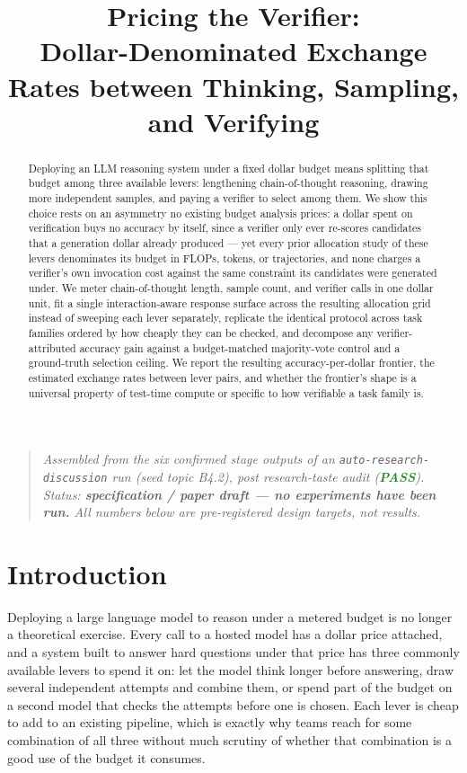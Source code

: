 \documentclass[11pt]{article}
\title{\textbf{Pricing the Verifier:\\ Dollar-Denominated Exchange Rates between Thinking, Sampling, and Verifying}}
\author{}
\date{}
\begin{document}
\maketitle
\vspace{-2em}

\begin{quote}
\small\textit{Assembled from the six confirmed stage outputs of an \texttt{auto-research-discussion} run (seed topic B4.2), post research-taste audit (\textcolor{ForestGreen}{\textbf{PASS}}). Status: \textbf{specification / paper draft --- no experiments have been run.} All numbers below are pre-registered design targets, not results.}
\end{quote}

\begin{abstract}
Deploying an LLM reasoning system under a fixed dollar budget means splitting that budget among three available levers: lengthening chain-of-thought reasoning, drawing more independent samples, and paying a verifier to select among them. We show this choice rests on an asymmetry no existing budget analysis prices: a dollar spent on verification buys no accuracy by itself, since a verifier only ever re-scores candidates that a generation dollar already produced --- yet every prior allocation study of these levers denominates its budget in FLOPs, tokens, or trajectories, and none charges a verifier's own invocation cost against the same constraint its candidates were generated under. We meter chain-of-thought length, sample count, and verifier calls in one dollar unit, fit a single interaction-aware response surface across the resulting allocation grid instead of sweeping each lever separately, replicate the identical protocol across task families ordered by how cheaply they can be checked, and decompose any verifier-attributed accuracy gain against a budget-matched majority-vote control and a ground-truth selection ceiling. We report the resulting accuracy-per-dollar frontier, the estimated exchange rates between lever pairs, and whether the frontier's shape is a universal property of test-time compute or specific to how verifiable a task family is.
\end{abstract}

\section{Introduction}

Deploying a large language model to reason under a metered budget is no longer a theoretical exercise. Every call to a hosted model has a dollar price attached, and a system built to answer hard questions under that price has three commonly available levers to spend it on: let the model think longer before answering, draw several independent attempts and combine them, or spend part of the budget on a second model that checks the attempts before one is chosen. Each lever is cheap to add to an existing pipeline, which is exactly why teams reach for some combination of all three without much scrutiny of whether that combination is a good use of the budget it consumes.
\end{document}
